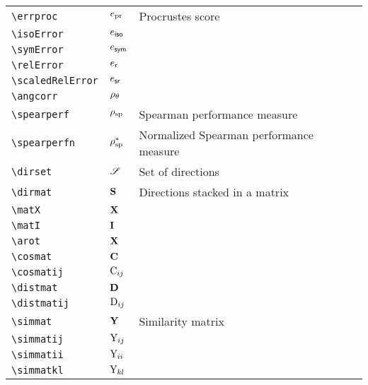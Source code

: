 \begin{longtable}{lll}
 {\color[rgb]{0.5,0.5,0.5}\texttt{\textbackslash errproc}} & $e_{\textrm{pr}}$ &  Procrustes score\\ 
 {\color[rgb]{0.5,0.5,0.5}\texttt{\textbackslash isoError}} & $e_{\textsf{iso}}$ & \\ 
 {\color[rgb]{0.5,0.5,0.5}\texttt{\textbackslash symError}} & $e_{\textsf{sym}}$ & \\ 
 {\color[rgb]{0.5,0.5,0.5}\texttt{\textbackslash relError}} & $e_{\textsf{r}}$ & \\ 
 {\color[rgb]{0.5,0.5,0.5}\texttt{\textbackslash scaledRelError}} & $e_{\textsf{sr}}$ & \\ 
 {\color[rgb]{0.5,0.5,0.5}\texttt{\textbackslash angcorr}} & $\rho_{\theta}$ & \\ 
 {\color[rgb]{0.5,0.5,0.5}\texttt{\textbackslash spearperf}} & $\rho_{\textrm{sp}}$ &  Spearman performance measure\\ 
 {\color[rgb]{0.5,0.5,0.5}\texttt{\textbackslash spearperfn}} & $\rho^{\ast}_{\textrm{sp}}$ &  Normalized Spearman performance measure\\ 
 {\color[rgb]{0.5,0.5,0.5}\texttt{\textbackslash dirset}} & $\mathscr{S}$ &  Set of directions\\ 
 {\color[rgb]{0.5,0.5,0.5}\texttt{\textbackslash dirmat}} & $\mathbf{S}$ &  Directions stacked in a matrix\\ 
 {\color[rgb]{0.5,0.5,0.5}\texttt{\textbackslash matX}} & $\mathbf{X}$ & \\ 
 {\color[rgb]{0.5,0.5,0.5}\texttt{\textbackslash matI}} & $\mathbf{I}$ & \\ 
 {\color[rgb]{0.5,0.5,0.5}\texttt{\textbackslash arot}} & $\mathbf{X}$ & \\ 
 {\color[rgb]{0.5,0.5,0.5}\texttt{\textbackslash cosmat}} & $\mathbf{C}$ & \\ 
 {\color[rgb]{0.5,0.5,0.5}\texttt{\textbackslash cosmatij}} & $\mathrm{C}_{ij}$ & \\ 
 {\color[rgb]{0.5,0.5,0.5}\texttt{\textbackslash distmat}} & $\mathbf{D}$ & \\ 
 {\color[rgb]{0.5,0.5,0.5}\texttt{\textbackslash distmatij}} & $\mathrm{D}_{ij}$ & \\ 
 {\color[rgb]{0.5,0.5,0.5}\texttt{\textbackslash simmat}} & $\mathbf{Y}$ &  Similarity matrix\\ 
 {\color[rgb]{0.5,0.5,0.5}\texttt{\textbackslash simmatij}} & $\mathrm{Y}_{ij}$ & \\ 
 {\color[rgb]{0.5,0.5,0.5}\texttt{\textbackslash simmatii}} & $\mathrm{Y}_{ii}$ & \\ 
 {\color[rgb]{0.5,0.5,0.5}\texttt{\textbackslash simmatkl}} & $\mathrm{Y}_{kl}$ & \\ 

\end{longtable}
